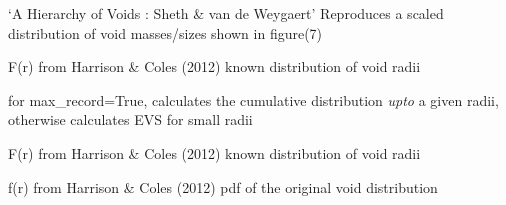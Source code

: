 \documentclass[letterpaper,10pt,english]{sphinxmanual}
\begin{document}

\begin{fulllineitems}
\label{PyCosmo:PyCosmo.void_distribution.scaled_void_distribution}
`A Hierarchy of Voids : Sheth \& van de Weygaert'
Reproduces a scaled distribution of void masses/sizes
shown in figure(7)

\end{fulllineitems}


\begin{fulllineitems}
\label{PyCosmo:PyCosmo.void_distribution.void_Fr}
F(r) from Harrison \& Coles (2012)
known distribution of void radii

for max\_record=True, calculates the cumulative 
distribution \emph{upto} a given radii, otherwise
calculates EVS for small radii

\end{fulllineitems}


\begin{fulllineitems}
\label{PyCosmo:PyCosmo.void_distribution.void_Fr_small}
F(r) from Harrison \& Coles (2012)
known distribution of void radii

\end{fulllineitems}


\begin{fulllineitems}
\label{PyCosmo:PyCosmo.void_distribution.void_and_cloud}
\end{fulllineitems}


\begin{fulllineitems}
\label{PyCosmo:PyCosmo.void_distribution.void_fr}
f(r) from Harrison \& Coles (2012)
pdf of the original void distribution

\end{fulllineitems}
\end{document}
